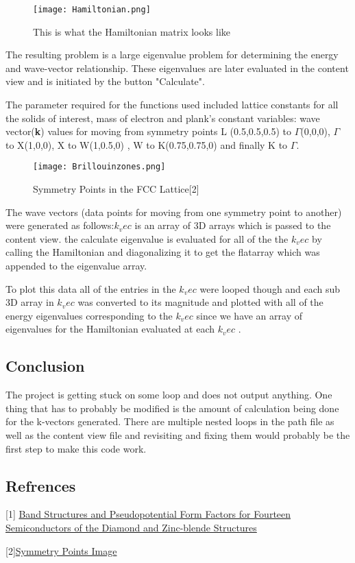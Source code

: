 \documentclass[%
 reprint,
 amsmath,amssymb,
 aps,
]{revtex4-2}
\begin{document}
\begin{figure}[H]
\texttt{[image: Hamiltonian.png]}%
\caption{\label{fig:Hamiltonian} This is what the Hamiltonian matrix looks like}
\end{figure}

The resulting problem is a large eigenvalue problem for determining the energy and wave-vector relationship. These eigenvalues are later evaluated in the content view and is initiated by the button "Calculate".

The parameter required for the functions used included lattice constants for all the solids of interest, mass of electron and plank's constant  
variables: wave vector(\textbf{k}) values for moving from symmetry points L (0.5,0.5,0.5) to $\Gamma$(0,0,0), $\Gamma$ to X(1,0,0), X to W(1,0.5,0) , W to K(0.75,0.75,0) and finally K to $\Gamma$. 

\begin{figure}[H]
\texttt{[image: Brillouinzones.png]}%
\caption{\label{fig:Hamiltonian} Symmetry Points in the FCC Lattice[2]}
\end{figure}


The wave vectors (data points for moving from one symmetry point to another) were generated as follows:$k_vec$  is an array of 3D arrays which is passed to the content view. the calculate eigenvalue is evaluated for all of the the $k_vec$ by calling the Hamiltonian and diagonalizing it to get the flatarray which was appended to the eigenvalue array. 

To plot this data all of the entries in the $k_vec$ were looped though and each sub 3D array in $k_vec$ was converted to its magnitude and plotted with all of the energy eigenvalues corresponding to the $k_vec$ since we have an array of eigenvalues for the Hamiltonian evaluated at each $k_vec$ .

\subsection{\label{sec:level3}Conclusion}
The project is getting stuck on some loop and does not output anything. One thing that has to probably be modified is the amount of calculation being done for the k-vectors generated. There are multiple nested loops in the path file as well as the content view file and revisiting and fixing them would probably be the first step to make this code work. 



\appendix


\subsection{\label{sec:level2}Refrences}

[1] \href{https://journals.aps.org/pr/abstract/10.1103/PhysRev.141.789}{Band Structures and Pseudopotential Form Factors for Fourteen Semiconductors of the Diamond and Zinc-blende Structures} \\
\bigskip

[2]\href{http://esd.cos.gmu.edu/tb/kpts/fcc/index.html}{Symmetry Points Image}\\
\end{document}
